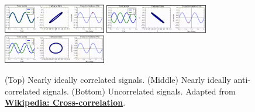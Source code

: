 \documentclass{article}
\begin{document}
\begin{figure}
\centering
\includegraphics[width=0.4\textwidth]{corr1.png}
\includegraphics[width=0.4\textwidth]{corr2.png}
\includegraphics[width=0.4\textwidth]{corr3.png}
\caption{\label{fig:1} (Top) Nearly ideally correlated signals. (Middle) Nearly ideally anti-correlated signals. (Bottom) Uncorrelated signals.  Adapted from \textbf{\href{https://en.wikipedia.org/wiki/Cross-correlation}{Wikipedia: Cross-correlation}}.}
\end{figure}
\end{document}
